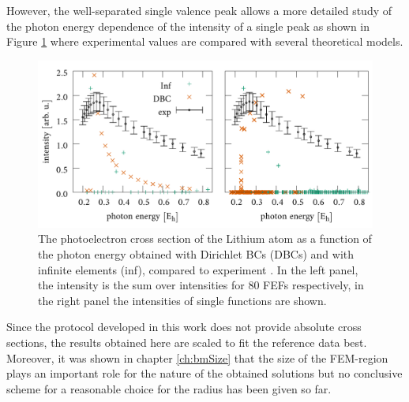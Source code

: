 However, the well-separated single valence peak allows a more detailed study of the photon energy dependence of the intensity of a single peak as shown in Figure \ref{fig:Li-CS} where experimental values are compared with several theoretical models.
\begin{figure}
\includegraphics[width=\textwidth]{Figures/Lithium/CrossSect2}
\caption{The photoelectron cross section of the Lithium atom as a function of the photon energy obtained with Dirichlet BCs (DBCs) and with infinite elements (inf), compared to experiment  \cite{LiCS}.
In the left panel, the intensity is the sum over intensities for $80$ FEFs respectively, in the right panel the intensities of single functions are shown.}
\label{fig:Li-CS}
\end{figure}
Since the protocol developed in this work does not provide absolute cross sections, the results obtained here are scaled to fit the reference data best.
Moreover, it was shown in chapter \ref{ch:bmSize} that the size of the FEM-region plays an important role for the nature of the obtained solutions but no conclusive scheme for a reasonable choice for the radius has been given so far.


